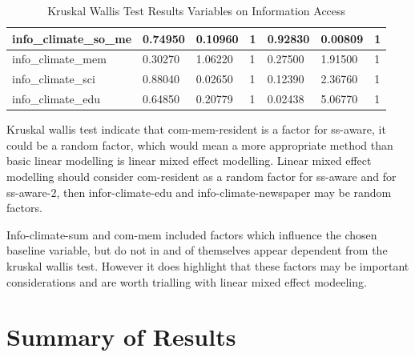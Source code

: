 \begin{table}[h]
\begin{tabular}{|l|l|l|l|l|l|l|}
        info\_climate\_so\_me & 0.74950 & 0.10960 & 1 & 0.92830 & 0.00809 & 1 \\ \hline
        info\_climate\_mem & 0.30270 & 1.06220 & 1 & 0.27500 & 1.91500 & 1 \\ \hline
        info\_climate\_sci & 0.88040 & 0.02650 & 1 & 0.12390 & 2.36760 & 1 \\ \hline
        info\_climate\_edu & 0.64850 & 0.20779 & 1 & \cellcolor[HTML]{7df9ff} 0.02438 & 5.06770 & 1 \\ \hline
    \end{tabular}
    \caption{Kruskal Wallis Test Results Variables on Information Access}
    \label{Kruskal_wallis_test_information}
\end{table}

Kruskal wallis test indicate that com-mem-resident is a factor for ss-aware, it could be a random factor, which would mean a more appropriate method than basic linear modelling is linear mixed effect modelling. Linear mixed effect modelling should consider com-resident as a random factor for ss-aware and for ss-aware-2, then infor-climate-edu and info-climate-newspaper may be random factors.

Info-climate-sum and com-mem included factors which influence the chosen baseline variable, but do not in and of themselves appear dependent from the kruskal wallis test. However it does highlight that these factors may be important considerations and are worth trialling with linear mixed effect modeeling.




\section{Summary of Results}
